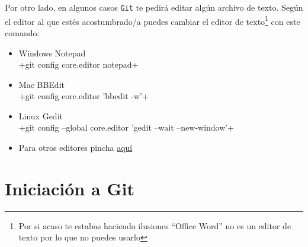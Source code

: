 \documentclass[a5paper,10pt]{article}
\begin{document}
    Por otro lado, en algunos casos \verb+Git+ te pedirá editar algún archivo de texto. Según el editor al que estés acostumbrado/a puedes cambiar el editor de texto\footnote{Por si acaso te estabas haciendo ilusiones ``Office Word'' no es un editor de texto por lo que no puedes usarlo} con este comando:
    
    \begin{itemize}
     \item Windows Notepad\\ \cverb+git config core.editor notepad+
     \item Mac BBEdit\\ \cverb+git config core.editor 'bbedit -w'+
     \item Linux Gedit\\ \cverb+git config --global core.editor 'gedit --wait --new-window'+
     \item Para otros editores pincha \href{https://git-scm.com/book/en/v2/Appendix-C%3A-Git-Commands-Setup-and-Config}{aquí}
    \end{itemize}

  \section{Iniciación a Git}
\end{document}

